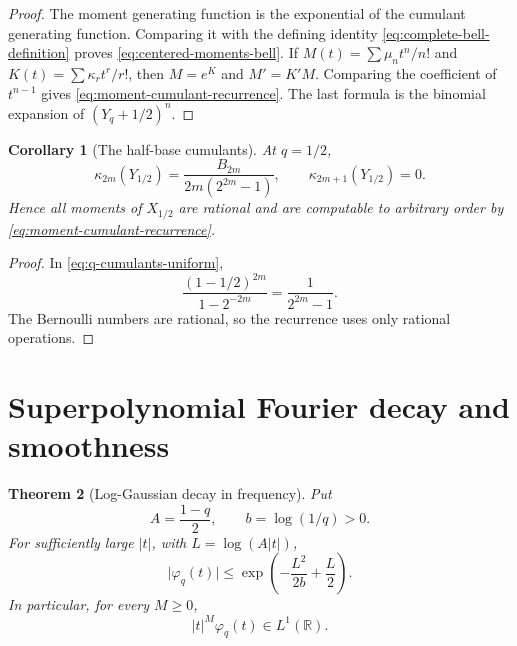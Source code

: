 \documentclass[11pt,oneside,openany]{book}
\newtheorem{theorem}{Theorem}[chapter]
\newtheorem{corollary}[theorem]{Corollary}
\theoremstyle{definition}
\theoremstyle{remark}
\newcommand{\R}{\mathbb R}
\newcommand{\abs}[1]{\lvert #1\rvert}
\begin{document}
\begin{proof}
The moment generating function is the exponential of the cumulant generating function.  Comparing it with the defining identity
\eqref{eq:complete-bell-definition} proves \eqref{eq:centered-moments-bell}.  If
$M(t)=\sum\mu_nt^n/n!$ and $K(t)=\sum\kappa_rt^r/r!$, then
$M=e^K$ and $M'=K'M$.  Comparing the coefficient of $t^{n-1}$ gives
\eqref{eq:moment-cumulant-recurrence}.  The last formula is the binomial expansion of $(Y_q+1/2)^n$.
\end{proof}

\begin{corollary}[The half-base cumulants]\label{cor:halfbase-cumulants}
At $q=1/2$,
\begin{equation}\label{eq:halfbase-cumulants}
 \kappa_{2m}(Y_{1/2})
 =\frac{B_{2m}}{2m(2^{2m}-1)},
 \qquad
 \kappa_{2m+1}(Y_{1/2})=0.
\end{equation}
Hence all moments of $X_{1/2}$ are rational and are computable to arbitrary order by \eqref{eq:moment-cumulant-recurrence}.
\end{corollary}

\begin{proof}
In \eqref{eq:q-cumulants-uniform},
\[
 \frac{(1-1/2)^{2m}}{1-2^{-2m}}
 =\frac1{2^{2m}-1}.
\]
The Bernoulli numbers are rational, so the recurrence uses only rational operations.
\end{proof}

\section{Superpolynomial Fourier decay and smoothness}

\begin{theorem}[Log-Gaussian decay in frequency]\label{thm:geometric-uniform-fourier-decay}
Put
\[
 A=\frac{1-q}{2},
 \qquad
 b=\log(1/q)>0.
\]
For sufficiently large $\abs t$, with $L=\log(A\abs t)$,
\begin{equation}\label{eq:log-gaussian-fourier-bound}
 \abs{\varphi_q(t)}
 \le \exp\!\left(-\frac{L^2}{2b}+\frac L2\right).
\end{equation}
In particular, for every $M\ge0$,
\[
 \abs t^M\varphi_q(t)\in L^1(\R).
\]
\end{theorem}
\end{document}
